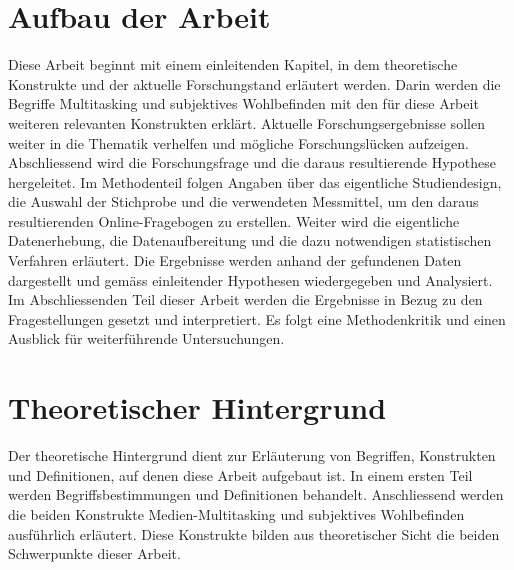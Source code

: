 \section{Aufbau der Arbeit}\label{section.einleitung.aufbau}
Diese Arbeit beginnt mit einem einleitenden Kapitel, in dem theoretische Konstrukte und der aktuelle Forschungstand erläutert werden. Darin werden die Begriffe Multitasking und subjektives Wohlbefinden mit den für diese Arbeit weiteren relevanten Konstrukten erklärt. Aktuelle Forschungsergebnisse sollen weiter in die Thematik verhelfen und mögliche Forschungslücken aufzeigen. Abschliessend wird die Forschungsfrage und die daraus resultierende Hypothese hergeleitet. Im Methodenteil folgen Angaben über das eigentliche Studiendesign, die Auswahl der Stichprobe und die verwendeten Messmittel, um den daraus resultierenden Online-Fragebogen zu erstellen. Weiter wird die eigentliche Datenerhebung, die Datenaufbereitung und die dazu notwendigen statistischen Verfahren erläutert. Die Ergebnisse werden anhand der gefundenen Daten dargestellt und gemäss einleitender Hypothesen wiedergegeben und Analysiert. Im Abschliessenden Teil dieser Arbeit werden die Ergebnisse in Bezug zu den Fragestellungen gesetzt und interpretiert. Es folgt eine Methodenkritik und einen Ausblick für weiterführende Untersuchungen.

\section{Theoretischer Hintergrund}\label{section.einleitung.theoHintegrund}
Der theoretische Hintergrund dient zur Erläuterung von Begriffen, Konstrukten und Definitionen, auf denen diese Arbeit aufgebaut ist. In einem ersten Teil werden Begriffsbestimmungen und Definitionen behandelt. Anschliessend werden die beiden Konstrukte Medien-Multitasking und subjektives Wohlbefinden ausführlich erläutert. Diese Konstrukte bilden aus theoretischer Sicht die beiden Schwerpunkte dieser Arbeit.
